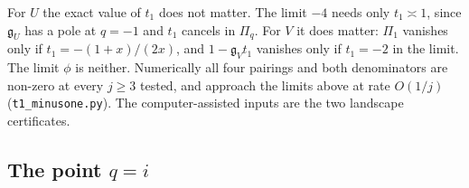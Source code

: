 \documentclass[11pt]{article}
\theoremstyle{plain}
\theoremstyle{definition}
\theoremstyle{remark}
\theoremstyle{plain}\newtheorem*{maintheorem}{Main Theorem}
\begin{document}
\noindent For $U$ the exact value of $t_1$ does not matter. The limit $-4$ needs only
$t_1\asymp1$, since $\mathfrak g_U$ has a pole at $q=-1$ and $t_1$ cancels in $\Pi_q$. For $V$ it
does matter: $\Pi_1$ vanishes only if $t_1=-(1+x)/(2x)$, and $1-\mathfrak g_Vt_1$ vanishes only if
$t_1=-2$ in the limit. The limit $\phi$ is neither. Numerically all four pairings and both
denominators are non-zero at every $j\ge3$ tested, and approach the limits above at rate $O(1/j)$
(\texttt{t1\_minusone.py}). The computer-assisted inputs are the two landscape certificates.

\subsection{The point \texorpdfstring{$q=i$}{q=i}}\label{sec:qi}
\end{document}
